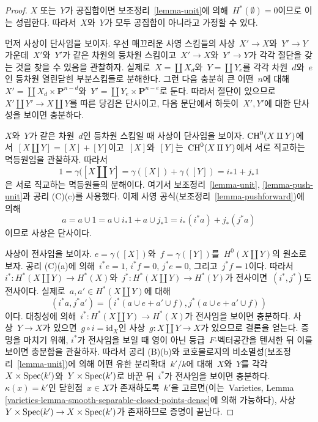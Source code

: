 \begin{proof}
$X$ 또는\  $Y$가 공집합이면 보조정리\  \ref{lemma-unit}에 의해\ 
$H^*(\emptyset) = 0$이므로 이는 성립한다. 따라서\  $X$와\  $Y$가 모두
공집합이 아니라고 가정할 수 있다.

\medskip\noindent
먼저 사상이 단사임을 보이자. 우선 매끄러운 사영 스킴들의 사상\ 
$X' \to X$와\  $Y' \to Y$ 가운데\  $X'$와\  $Y'$가 같은 차원의 등차원
스킴이고\  $X' \to X$와\  $Y' \to Y$가 각각 절단을 갖는 것을 찾을 수
있음을 관찰하자. 실제로\  $X = \coprod X_d$와\  $Y = \coprod Y_e$를
각각 차원\  $d$와\  $e$인 등차원 열린닫힌 부분스킴들로 분해한다.
그런 다음 충분히 큰 어떤\  $n$에 대해\ 
$X' = \coprod X_d \times \mathbf{P}^{n - d}$와\ 
$Y' = \coprod Y_e \times \mathbf{P}^{n - e}$로 둔다. 따라서 절단이
있으므로\  $X' \amalg Y' \to X \amalg Y$를 따른 당김은 단사이고,
다음 문단에서 하듯이\  $X', Y'$에 대한 단사성을 보이면 충분하다.

\medskip\noindent
$X$와\  $Y$가 같은 차원\  $d$인 등차원 스킴일 때 사상이 단사임을 보이자.
$\mathop{\mathrm{CH}}\nolimits^0(X \amalg Y)$에서\  $[X \amalg Y] = [X] + [Y]$이고\ 
$[X]$와\  $[Y]$는\  $\mathop{\mathrm{CH}}\nolimits^0(X \amalg Y)$에서 서로 직교하는 멱등원임을
관찰하자. 따라서
$$
1 = \gamma([X \amalg Y] = \gamma([X]) + \gamma([Y]) = i_*1 + j_*1
$$
은 서로 직교하는 멱등원들의 분해이다. 여기서 보조정리\ 
\ref{lemma-unit}, \ref{lemma-push-unit}과 공리 (C)(c)를 사용했다.
이제 사영 공식(보조정리\  \ref{lemma-pushforward})에 의해
$$
a = a \cup 1 = a \cup i_*1 + a \cup j_*1 =
i_*(i^*a) + j_*(j^*a)
$$
이므로 사상은 단사이다.

\medskip\noindent
사상이 전사임을 보이자. $e = \gamma([X])$와\  $f = \gamma([Y])$를\ 
$H^0(X \amalg Y)$의 원소로 보자. 공리 (C)(a)에 의해\ 
$i^*e = 1$, $i^*f = 0$, $j^*e = 0$, 그리고\  $j^*f = 1$이다.
따라서\  $i^* : H^*(X \amalg Y) \to  H^*(X)$와\ 
$j^* : H^*(X \amalg Y) \to H^*(Y)$가 전사이면\  $(i^*, j^*)$도
전사이다. 실제로\  $a, a' \in H^*(X \amalg Y)$에 대해
$$
(i^*a, j^*a') = (i^*(a \cup e + a' \cup f), j^*(a \cup e + a' \cup f))
$$
이다. 대칭성에 의해\  $i^* : H^*(X \amalg Y) \to  H^*(X)$가 전사임을
보이면 충분하다. 사상\  $Y \to X$가 있으면\ 
$g \circ i = \text{id}_X$인 사상\  $g : X \amalg Y \to X$가 있으므로
결론을 얻는다. 증명을 마치기 위해, $i^*$가 전사임을 보일 때 영이 아닌
등급\  $F$-벡터공간을 텐서한 뒤 이를 보이면 충분함을 관찰하자. 따라서
공리 (B)(b)와 코호몰로지의 비소멸성(보조정리\  \ref{lemma-unit})에 의해
어떤 유한 분리확대\  $k'/k$에 대해\  $X$와\  $Y$를 각각\ 
$X \times \mathop{\mathrm{Spec}}(k')$와\  $Y \times \mathop{\mathrm{Spec}}(k')$로 바꾼 뒤\  $i^*$가
전사임을 보이면 충분하다. $\kappa(x) = k'$인 닫힌점\  $x \in X$가
존재하도록\  $k'$을 고르면(이는\  Varieties, Lemma
\ref{varieties-lemma-smooth-separable-closed-points-dense}에 의해 가능하다),
사상\  $Y \times \mathop{\mathrm{Spec}}(k') \to X \times \mathop{\mathrm{Spec}}(k')$가 존재하므로 증명이
끝난다.
\end{proof}

